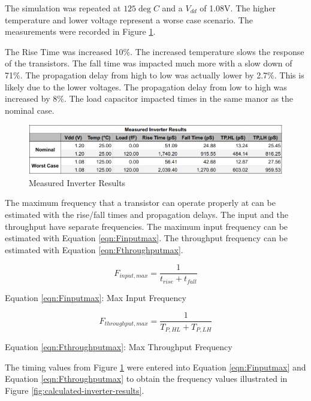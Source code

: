 \documentclass[11pt]{article}
\begin{document}
		The simulation was repeated at $125\deg C$ and a $V_{dd}$ of 1.08V. The higher temperature and lower voltage represent a worse case scenario. The measurements were recorded in Figure \ref{fig:measured-inverter-results}.
		
		The Rise Time was increased 10\%. The increased temperature slows the response of the transistors. The fall time was impacted much more with a slow down of 71\%. The propagation delay from high to low was actually lower by 2.7\%. This is likely due to the lower voltages. The propagation delay from low to high was increased by 8\%. The load capacitor impacted times in the same manor as the nominal case.
		
		
		\begin{figure}[H]
			\centering
			\includegraphics[width=1\linewidth]{"Pictures/Measured Inverter Results"}
			\caption[Inverter Results]{Measured Inverter Results}
			\label{fig:measured-inverter-results}
		\end{figure}
	
		The maximum frequency that a transistor can operate properly at can be estimated with the rise/fall times and propagation delays. The input and the throughput have separate frequencies. The maximum input frequency can be estimated with Equation \ref{eqn:Finputmax}. The throughput frequency can be estimated with Equation \ref{eqn:Fthroughputmax}. 
	
		\begin{equation}\label{eqn:Finputmax}
			F_{input,max} = \frac{1}{t_{rise}+t_{fall}}
		\end{equation}
		\begin{center}
			Equation \ref{eqn:Finputmax}: Max Input Frequency
		\end{center}
	
		\begin{equation}\label{eqn:Fthroughputmax}
			F_{throughput,max} = \frac{1}{T_{P,HL}+T_{P,LH}}
		\end{equation}
		\begin{center}
			Equation \ref{eqn:Fthroughputmax}: Max Throughput Frequency
		\end{center}
	
		The timing values from Figure \ref{fig:measured-inverter-results} were entered into Equation \ref{eqn:Finputmax} and Equation \ref{eqn:Fthroughputmax} to obtain the frequency values illustrated in Figure \ref{fig:calculated-inverter-results}.
	
\end{document}
